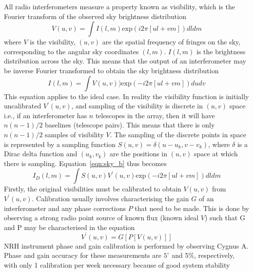 All radio interferometers measure a property known as visibility, which is the Fourier transform of the observed sky brightness distribution
\begin{equation}
V(u,v)=\int I(l,m)\mathrm{exp}(i2\pi[ul +vm])dldm
\end{equation}
where $V$ is the visibility, $(u,v)$ are the spatial frequency of fringes on the sky, corresponding to the angular sky coordinates $(l,m)$. $I(l,m)$ is the brightness distribution across the sky. This means that the output of an interferometer may be inverse Fourier transformed to obtain the sky brightness distribution
\begin{equation}
I(l,m)=\int V(u,v))\mathrm{exp}(-i2\pi[ul +vm])dudv
\label{eqn:sky_b}
\end{equation}
This equation applies to the ideal case. In reality the visibility function is initially uncalibrated $V^{'}(u,v)$, and sampling of the visibility is discrete in $(u,v)$ space i.e., if an interferometer has $n$ telescopes in the array, then it will have $n(n-1)/2$ baselines (telescope pairs). This means that there is only $n(n-1)/2$ samples of visibility $V$. The sampling of the discrete points in space is represented by a sampling function $S(u,v) = \delta(u-u_k, v-v_k)$, where $\delta$ is a Dirac delta function and $(u_k, v_k)$ are the positions in $(u, v)$ space at which there is sampling. Equation~\ref{eqn:sky_b} thus becomes
\begin{equation}
I_D(l,m)=\int S(u,v)V^{'}(u,v)\mathrm{exp}(-i2\pi[ul +vm])dldm
\label{eqn:VS}
\end{equation}
Firstly, the original visibilities must be calibrated to obtain $V(u,v)$ from $V^{'}(u,v)$. Calibration usually involves characterising the gain $G$ of an interferometer and any phase corrections $P$ that need to be made. This is done by observing a strong radio point source of known flux (known ideal $V$) such that G and P may be characterised in the equation
\begin{equation}
V^{'}(u,v) = G[ P[V(u,v)] ]
\end{equation}
NRH instrument phase and gain calibration is performed by observing Cygnus A. Phase and gain accuracy for these measurements are $5^{\circ}$ and 5\%, respectively, with only 1 calibration per week necessary because of good system stability \citep{avignon1989, mercier2009}

